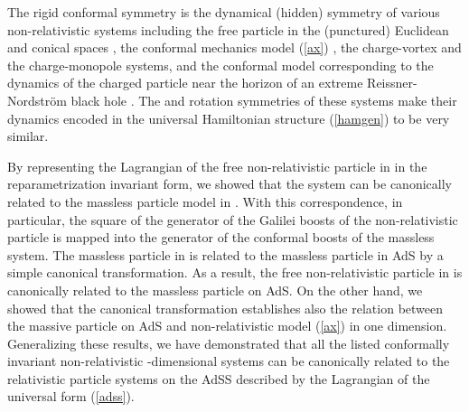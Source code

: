 \documentclass[a4paper,12pt]{article}
\def\R{\mathbb R}
\begin{document}
The rigid conformal \coordHE{} symmetry
is  the dynamical (hidden) symmetry of various
non-relativistic systems including the
free particle in the (punctured) Euclidean
and conical spaces \cite{Des},
the conformal mechanics model (\ref{ax}) \cite{AFF},
the charge-vortex \cite{Jackv} and the charge-monopole
\cite{Jackm,mp}
systems, and the conformal model
corresponding to the dynamics of the
charged particle near the horizon of an extreme
Reissner-Nordstr\"om black hole \cite{kallosh}.
The \coordHE{} and rotation symmetries
of these systems
make their dynamics
encoded in the universal Hamiltonian
structure (\ref{hamgen})
to be very similar.


By representing the Lagrangian of the
free non-relativistic particle
in \myHighlight{$\R^1$}\coordHE{} in the reparametrization invariant form,
we showed that the system
can be canonically related
to the massless particle model in \myHighlight{$\R^{1,1}$}\coordHE{}.
With this correspondence, in particular, the square
of the generator of the Galilei boosts of the
non-relativistic particle is mapped into the
generator of the conformal boosts
of the massless system.
The massless particle in \myHighlight{${\cal R}^{1,1}=\R^{1,1}-\{0\}$}\coordHE{}
is related to the massless particle
in AdS\coordHE{} by a simple canonical transformation.
As a result, the free non-relativistic particle
in \myHighlight{${\cal R}^1=\R^1-\{0\}$}\coordHE{} is canonically related
to the massless particle on AdS\coordHE{}.
On the other hand, we showed that the
canonical transformation establishes also
the relation between the massive particle
on AdS\coordHE{} and non-relativistic model
(\ref{ax}) in one dimension.
Generalizing these results,
we have demonstrated that
all the listed conformally invariant
non-relativistic \coordHE{}-dimensional systems
can be canonically related
to the relativistic particle systems
on the AdS\myHighlight{${}_2\times$}\coordHE{}S\coordHE{}
described by the Lagrangian of the
universal form (\ref{adss}).
\end{document}
